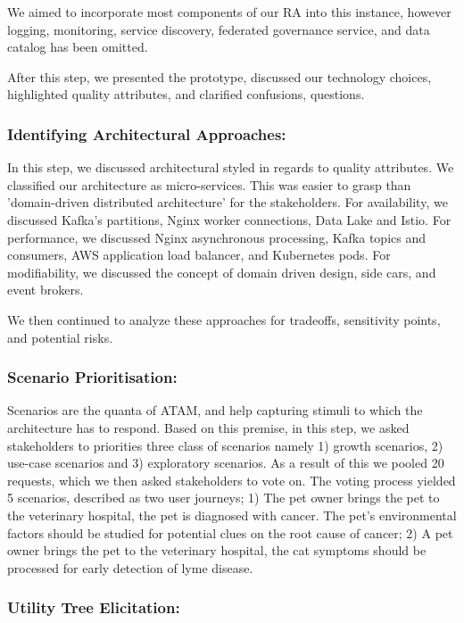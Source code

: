 \documentclass[runningheads]{llncs}
\begin{document}
We aimed to incorporate most components of our RA into this instance, however logging, monitoring, service discovery, federated governance service, and data catalog has been omitted. 

After this step, we presented the prototype, discussed our technology choices, highlighted quality attributes, and clarified confusions, questions. 

\subsubsection{Identifying Architectural Approaches:}

In this step, we discussed architectural styled in regards to quality attributes. We classified our architecture as micro-services. This was easier to grasp than 'domain-driven distributed architecture' for the stakeholders. For availability, we discussed Kafka's partitions, Nginx worker connections, Data Lake and Istio.  For performance, we discussed Nginx asynchronous processing, Kafka topics and consumers, AWS application load balancer, and Kubernetes pods. For modifiability, we discussed the concept of domain driven design, side cars, and event brokers. 

We then continued to analyze these approaches for tradeoffs, sensitivity points, and potential risks. 

\subsubsection{Scenario Prioritisation: }

Scenarios are the quanta of ATAM, and help capturing stimuli to which the architecture has to respond. Based on this premise, in this step, we asked stakeholders to priorities three class of scenarios namely 1) growth scenarios, 2) use-case scenarios and 3) exploratory scenarios. As a result of this we pooled 20 requests, which we then asked stakeholders to vote on. The voting process yielded 5 scenarios, described as two user journeys; 1) The pet owner brings the pet to the veterinary hospital, the pet is diagnosed with cancer. The pet's environmental factors should be studied for potential clues on the root cause of cancer; 2) A pet owner brings the pet to the veterinary hospital, the cat symptoms should be processed for early detection of lyme disease. 

\subsubsection{Utility Tree Elicitation: }
\end{document}
